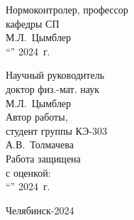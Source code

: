 \begin{adjustwidth}[]{0cm}{0cm}
\begin{center}
\begin{linespread}{1}
\parbox[t]{7cm}{
Нормоконтролер, профессор \\
кафедры СП \\[0.5em]
\underfield{} М.Л.~Цымблер \\[0.5em]
``\underline{\qquad}''\underfield{} 2024~г.
}
\hfill
\parbox[t]{7cm}{
Научный руководитель \\
доктор физ.-мат. наук\\[0.5em]
\underfield{} М.Л.~Цымблер \\[2.5em]
Автор работы, \\
студент группы КЭ-303\\[0.5em]
\underfield{} А.В.~Толмачева \\[2.5em]
Работа защищена\\
с оценкой: \underfield{}\\[0.5em]
``\underline{\qquad}''\underfield{} 2024~г.
}

\vspace{2.5em}

Челябинск-2024

\end{linespread}
\end{center}
\end{adjustwidth}

\pagebreak
